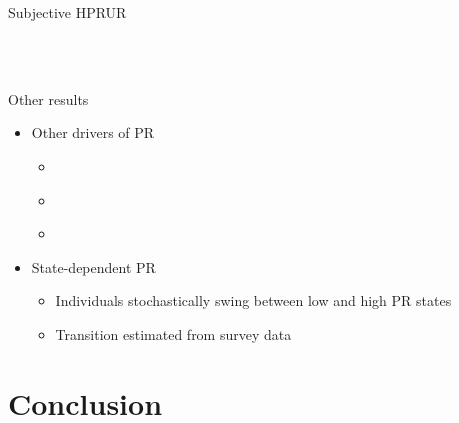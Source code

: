 \documentclass{beamer}
\begin{document}
\begin{frame}{Subjective HPRUR}
	\label{StE_dist_compare_SHPRUR}
	
	\begin{figure}[!ht]
		\begin{center}
			 \\
			 \\
		\end{center}
	\end{figure}
\end{frame}	


\begin{frame}{Other results}
	
	\begin{itemize}
		\item Other drivers of PR
		\begin{itemize}
			\item \hyperlink{appendix:PR_macro_labor_market_correlation}{}
			\item \hyperlink{appendix:extrapolation}{}
			\item \hyperlink{appendix:experience}{}
		\end{itemize}
\item State-dependent PR 
\begin{itemize}
	\item Individuals stochastically swing between low and high PR states
	\item Transition estimated from survey data  \hyperlink{RegimeEstimation}{}
\end{itemize}

\end{itemize}
\end{frame}


\section{Conclusion}
\end{document}
